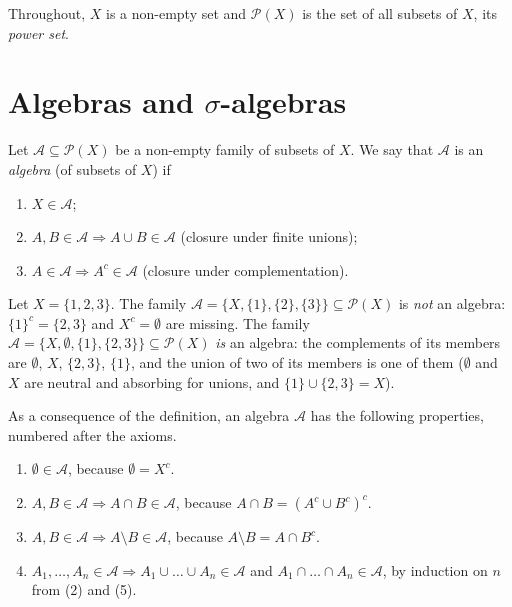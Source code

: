 
Throughout, $X$ is a non-empty set and $\mathcal P(X)$ is the set of all subsets of $X$, its
\emph{power set}.

\section{Algebras and \texorpdfstring{$\sigma$}{sigma}-algebras}\label{sec:sa-algebras}

\begin{definition}[Algebra]\label{def:sa-algebra}
Let $\mathcal A\subseteq\mathcal P(X)$ be a non-empty family of subsets of $X$. We say that
$\mathcal A$ is an \emph{algebra} (of subsets of $X$) if
\begin{enumerate}[label=(\arabic*)]
  \item $X\in\mathcal A$;
  \item $A,B\in\mathcal A\Rightarrow A\cup B\in\mathcal A$ (closure under finite unions);
  \item $A\in\mathcal A\Rightarrow A^c\in\mathcal A$ (closure under complementation).
\end{enumerate}
\end{definition}

\begin{example}\label{exa:sa-three-points}
Let $X=\{1,2,3\}$. The family $\mathcal A=\{X,\{1\},\{2\},\{3\}\}\subseteq\mathcal P(X)$ is
\emph{not} an algebra: $\{1\}^c=\{2,3\}$ and $X^c=\emptyset$ are missing. The family
$\mathcal A=\{X,\emptyset,\{1\},\{2,3\}\}\subseteq\mathcal P(X)$ \emph{is} an algebra: the
complements of its members are $\emptyset$, $X$, $\{2,3\}$, $\{1\}$, and the union of two of
its members is one of them ($\emptyset$ and $X$ are neutral and absorbing for unions, and
$\{1\}\cup\{2,3\}=X$).
\end{example}

\begin{remark}\label{rem:sa-consequences}
As a consequence of the definition, an algebra $\mathcal A$ has the following properties,
numbered after the axioms.
\begin{enumerate}[label=(\arabic*),start=4]
  \item $\emptyset\in\mathcal A$, because $\emptyset=X^c$.
  \item $A,B\in\mathcal A\Rightarrow A\cap B\in\mathcal A$, because $A\cap B=(A^c\cup B^c)^c$.
  \item $A,B\in\mathcal A\Rightarrow A\setminus B\in\mathcal A$, because $A\setminus B=A\cap B^c$.
  \item $A_1,\dots,A_n\in\mathcal A\Rightarrow A_1\cup\dots\cup A_n\in\mathcal A$ and
    $A_1\cap\dots\cap A_n\in\mathcal A$, by induction on $n$ from (2) and (5).
\end{enumerate}
\end{remark}

